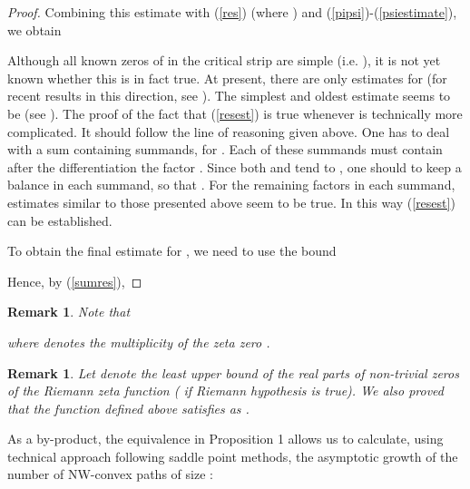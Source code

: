 \documentclass{article}
\newtheorem{remark}[theorem]{Remark}
\begin{document}
\begin{proof}
Combining this estimate with (\ref{res}) (where ) and
(\ref{pipsi})-(\ref{psiestimate}), we obtain

Although all known zeros  of  in the critical strip
are simple (i.e. ), it is not yet known whether this is in
fact true. At present, there are only estimates for  (for
recent results in this direction, see \cite{Ivic1999}). The simplest
and oldest estimate seems to be  (see
\cite[p.\ 211]{Titchmarsh86}). The proof of the fact that (\ref{resest})
is true whenever  is technically more complicated. It
should follow the line of reasoning given above. One has to deal
with a sum containing  summands, for
. Each
of these summands must contain after the differentiation the
factor . Since both
 and  tend to , one should to keep a balance in each
summand, so that . For the remaining
factors in each summand, estimates similar to those presented
above seem to be true. In this way (\ref{resest}) can be
established.

To obtain the final estimate for , we need to use the bound
\cite[p.\ 211]{Titchmarsh86}

Hence, by (\ref{sumres}),


\end{proof}
\begin{remark}Note that
 
 where  denotes the multiplicity of the zeta zero . 
\end{remark}

\begin{remark} Let  denote the least upper bound of the
real parts of non-trivial zeros of the Riemann zeta function
( if Riemann hypothesis is true). We also proved that the function  defined above
satisfies  as .
\end{remark}

As a by-product, the equivalence in Proposition 1 allows us to
calculate, using technical approach \cite{Flajolet1991} following saddle point methods, the asymptotic growth of the number of NW-convex paths
of size :
\end{document}
